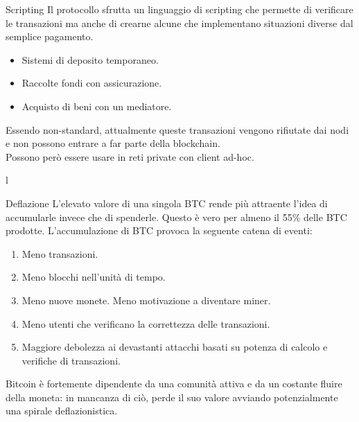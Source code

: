 \documentclass[italian]{beamer}
\begin{document}
\begin{frame}{Scripting}
Il protocollo sfrutta un linguaggio di scripting che permette di verificare le transazioni ma anche di crearne alcune che implementano situazioni diverse dal semplice pagamento.
\begin{itemize}
\item Sistemi di deposito temporaneo.
\item Raccolte fondi con assicurazione.
\item Acquisto di beni con un mediatore.
\end{itemize}
\bigskip
\pause
Essendo non-standard, attualmente queste transazioni vengono rifiutate dai nodi e non possono entrare a far parte della blockchain.\\
Possono però essere usare in reti private con client ad-hoc.
\end{frame}l

\begin{frame}{Deflazione}
 L'elevato valore di una singola BTC rende più attraente l'idea di accumularle invece che di spenderle. Questo è vero per almeno il 55\% delle BTC prodotte. L'accumulazione di BTC provoca la seguente catena di eventi:
 \begin{enumerate}
  \item Meno transazioni. \puase
  \item Meno blocchi nell'unità di tempo. \puase
  \item Meno nuove monete. \puase
  \imte Meno motivazione a diventare miner. \puase
  \item Meno utenti che verificano la correttezza delle transazioni. \puase
  \item Maggiore debolezza ai devastanti attacchi basati su potenza di calcolo e verifiche di transazioni. \puase
 \end{enumerate}
 Bitcoin è fortemente dipendente da una comunità attiva e da un costante fluire della moneta: in mancanza di ciò, perde il suo valore avviando potenzialmente una spirale deflazionistica.
\end{frame}
\end{document}

